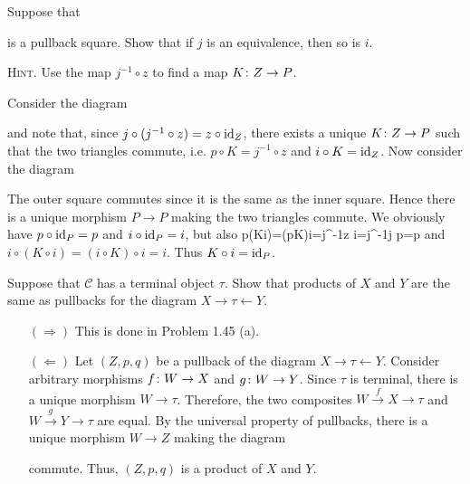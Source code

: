 \bp
Suppose that
\bse
{}
\ese
is a pullback square. Show that if $j$ is an equivalence, then so is $i$.

{\scshape Hint}. Use the map $j^{-1}\circ z$ to find a map $K\colon Z\to P$.
\ep

\bs
Consider the diagram
\bse
{}
\ese
and note that, since $j\circ(j^{-1}\circ z)=z\circ \mathrm{id}_Z$, there exists a unique $K\colon Z\to P$ such that the two triangles commute, i.e. $p\circ K=j^{-1}\circ z$ and $i\circ K=\mathrm{id}_Z$. Now consider the diagram
\bse
{}
\ese
The outer square commutes since it is the same as the inner square. Hence there is a unique morphism $P\to P$ making the two triangles commute. We obviously have $p\circ \mathrm{id}_P=p$ and $i\circ \mathrm{id}_P=i$, but also
\bse
p\circ(K\circ i)=(p\circ K)\circ i=j^{-1}\circ z \circ i=j^{-1}\circ j \circ p=p
\ese
and $i\circ(K\circ i)=(i\circ K)\circ i=i$. Thus $K\circ i=\mathrm{id}_P$.
\es

\bx
Suppose that $\mathcal{C}$ has a terminal object $\tau$. Show that products of $X$ and $Y$ are the same as pullbacks for the diagram $X\to \tau \leftarrow Y$.
\ex

\bs
\begin{itemize}
\item[$(\Rightarrow)$]
This is done in Problem 1.45 (a).
\item[$(\Leftarrow)$]
Let $(Z,p,q)$ be a pullback of the diagram $X\to\tau\leftarrow Y$. Consider arbitrary morphisms $f\colon W\to X$ and $g\colon W\to Y$. Since $\tau$ is terminal, there is a unique morphism $W\to \tau$. Therefore, the two composites $W\xrightarrow{\,f\,}X\to \tau$ and $W\xrightarrow{\,g\,}Y\to \tau$ are equal. By the universal property of pullbacks, there is a unique morphism $W\to Z$ making the diagram 
\bse
{}
\ese
commute. Thus, $(Z,p,q)$ is a product of $X$ and $Y$. 
\end{itemize}
\es

